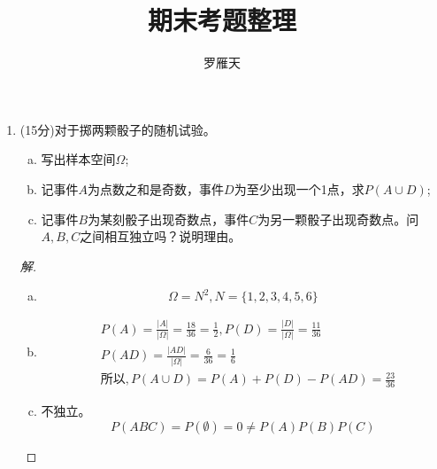 \documentclass[12pt]{article}
\newcommand{\hei}{\CJKfamily{hei}}                          %
\begin{document}
\author{罗雁天}
\title{期末考题整理}
\maketitle

\medskip

\begin{enumerate}
\item {\hei (15分)对于掷两颗骰子的随机试验。
\begin{enumerate}[(a)]
	\item 写出样本空间$\Omega$;
	\item 记事件$A$为点数之和是奇数，事件$D$为至少出现一个1点，求$P(A\cup D)$;
	\item 记事件$B$为某刻骰子出现奇数点，事件$C$为另一颗骰子出现奇数点。问$A,B,C$之间相互独立吗？说明理由。
\end{enumerate}
}
\begin{proof}[解]
	\begin{enumerate}[(a)]
	\item \begin{equation*}\Omega=N^2,N=\{1,2,3,4,5,6\}\end{equation*}
	\item \begin{equation*}
		\begin{aligned}
			&P(A)=\frac{|A|}{|\Omega|}=\frac{18}{36}=\frac{1}{2},P(D)=\frac{|D|}{|\Omega|}=\frac{11}{36} \\
			&P(AD)=\frac{|AD|}{|\Omega|}=\frac{6}{36}=\frac{1}{6} \\
			&\mbox{所以},P(A\cup D)=P(A)+P(D)-P(AD)=\frac{23}{36}
		\end{aligned}
	\end{equation*}
	\item 不独立。\begin{equation*}
		P(ABC)=P(\emptyset)=0\neq P(A)P(B)P(C)
	\end{equation*}
	\end{enumerate}
\end{proof}


\end{enumerate}
\end{document}
